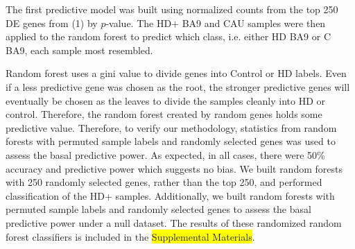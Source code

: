 \documentclass[fleqn,10pt,table]{wlscirep}
\newcommand{\todo}[1]{\colorbox{yellow}{#1}}
\begin{document}
The first predictive model was built using normalized counts from the top 250 DE genes from (1) by $p$-value.
The HD+ BA9 and CAU samples were then applied to the random forest to predict which class, i.e. either HD BA9 or C BA9, each sample most resembled.

Random forest uses a gini value to divide genes into Control or HD labels.
Even if a less predictive gene was chosen as the root, the stronger predictive genes will eventually be chosen as the leaves to divide the samples cleanly into HD or control.
Therefore, the random forest created by random genes holds some predictive value.
Therefore, to verify our methodology, statistics from random forests with permuted sample labels and randomly selected genes was used to assess the basal predictive power.
As expected, in all cases, there were 50\% accuracy and predictive power which suggests no bias.
We built random forests with 250 randomly selected genes, rather than the top 250, and performed classification of the HD+ samples.
Additionally, we built random forests with permuted sample labels and randomly selected genes to assess the basal predictive power under a null dataset.
The results of these randomized random forest classifiers is included in the \todo{Supplemental Materials}.
\end{document}
